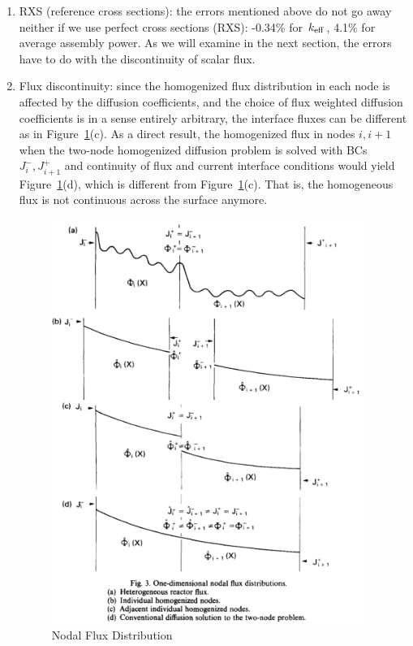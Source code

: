 \documentclass{school-22.211-notes}
\begin{document}
\begin{enumerate}
\item RXS (reference cross sections): the errors mentioned above do not go away neither if we use perfect cross sections (RXS): -0.34\% for $\left. k_{\mathrm{eff}} \right.$, 4.1\% for average assembly power. As we will examine in the next section, the errors have to do with the discontinuity of scalar flux. 

\item Flux discontinuity: since the homogenized flux distribution in each node is affected by the diffusion coefficients, and the choice of flux weighted diffusion coefficients is in a sense entirely arbitrary, the interface fluxes can be different as in Figure~\ref{1Dnodal-flux}(c). As a direct result, the homogenized flux in nodes $i, i+1$ when the two-node homogenized diffusion problem is solved with BCs $J_i^-, J_{i+1}^+$ and continuity of flux and current interface conditions would yield Figure~\ref{1Dnodal-flux}(d), which is different from Figure~\ref{1Dnodal-flux}(c). That is, the homogeneous flux is not continuous across the surface anymore. 
\begin{figure}[ht]
  \centering
  \includegraphics[width=4in]{images/methd/1Dnodal-flux.png}
  \caption{Nodal Flux Distribution} \label{1Dnodal-flux}
\end{figure}


\end{enumerate}
\end{document}
